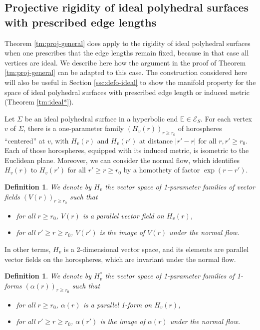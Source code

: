 \documentclass[notitlepage,twoside,a4paper]{amsart}
\newtheorem{definition}[theorem]{\rm\bf Definition}
\theoremstyle{named}
\newcommand{\bE}{{\mathbb E}}
\newcommand{\cE}{{\mathcal E}}
\begin{document}

\subsection{Projective rigidity of ideal polyhedral surfaces with prescribed edge lengths}
\label{ssc:prorig-ideal}

Theorem \ref{tm:proj-general} does apply to the rigidity of ideal polyhedral surfaces when one prescribes that the edge lengths remain fixed, because in that case all vertices are ideal. We describe here how the argument in the proof of Theorem \ref{tm:proj-general} can be adapted to this case. The construction considered here will also be useful in Section \ref{ssc:defo-ideal} to show the manifold property for the space of ideal polyhedral surfaces with prescribed edge length or induced metric (Theorem \ref{tm:ideal*}).

Let $\Sigma$ be an ideal polyhedral surface in a hyperbolic end $\bE\in \cE_S$. For each vertex $v$ of $\Sigma$, there is a one-parameter family $(H_v(r))_{r\geq r_0}$ of horospheres ``centered'' at $v$, with $H_v(r)$ and $H_v(r')$ at distance $|r'-r|$ for all $r,r'\geq r_0$. Each of those horospheres, equipped with its induced metric, is isometric to the Euclidean plane. Moreover, we can consider the normal flow, which identifies $H_v(r)$ to $H_v(r')$ for all $r'\geq r\geq r_0$ by a homothety of factor $\exp(r-r')$.

\begin{definition} \label{lm:H}
  We denote by $H_v$ the vector space of 1-parameter families of vector fields $(V(r))_{r\geq r_0}$ such that
  \begin{itemize}
  \item for all $r\geq r_0$, $V(r)$ is a parallel vector field on $H_v(r)$,
  \item for all $r'\geq r\geq r_0$, $V(r')$ is the image of $V(r)$ under the normal flow.
  \end{itemize}
\end{definition}

In other terms, $H_v$ is a 2-dimensional vector space, and its elements are parallel vector fields on the horospheres, which are invariant under the normal flow.

\begin{definition} \label{lm:H*}
  We denote by $H^*_v$ the vector space of 1-parameter families of 1-forms $(\alpha(r))_{r\geq r_0}$ such that
  \begin{itemize}
  \item for all $r\geq r_0$, $\alpha(r)$ is a parallel 1-form on $H_v(r)$,
  \item for all $r'\geq r\geq r_0$, $\alpha(r')$ is the image of $\alpha(r)$ under the normal flow.
  \end{itemize}
\end{definition}
\end{document}

